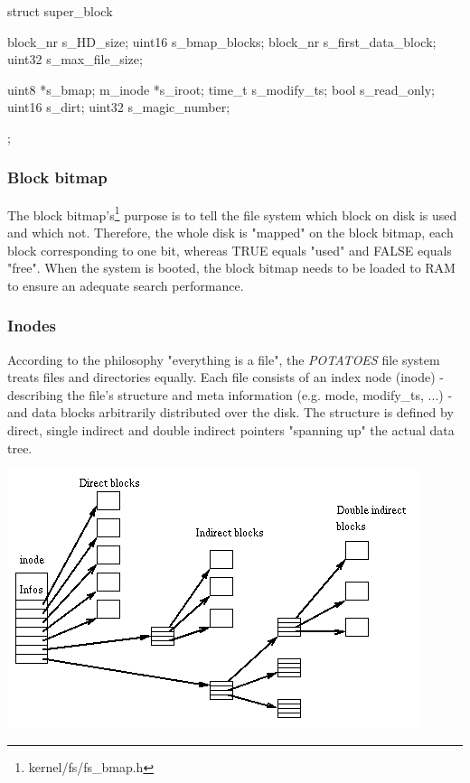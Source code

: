 \documentclass[11pt,a4paper]{scrartcl}
\begin{document}
\begin{code}
struct super_block {
		block_nr s_HD_size;
		uint16  s_bmap_blocks;
		block_nr s_first_data_block;
		uint32 s_max_file_size;

		uint8 *s_bmap;
		m_inode *s_iroot;
		time_t s_modify_ts;
		bool s_read_only;
		uint16 s_dirt;
		uint32 s_magic_number;
};
\end{code}

\subsubsection{Block bitmap}
\hypertarget{blockbitmap}{}
The block bitmap's\footnote{kernel/fs/fs\_bmap.h} purpose is to tell the file system which block on disk is used and which not. Therefore, the whole disk is "mapped" on the block bitmap, each block corresponding to one bit, whereas TRUE equals "used" and FALSE equals "free". When the system is booted, the block bitmap needs to be loaded to RAM to ensure an adequate search performance.

\subsubsection{Inodes}
According to the philosophy "everything is a file", the \textit{POTATOES} file system treats files and directories equally. Each file consists of an index node (inode) - describing the file's structure and meta information (e.g. mode, modify\_ts, ...) - and data blocks arbitrarily distributed over the disk. The structure is defined by direct, single indirect and double indirect pointers "spanning up" the actual data tree.
 
\includegraphics[width=\textwidth]{inode_concept.png}
\end{document}
